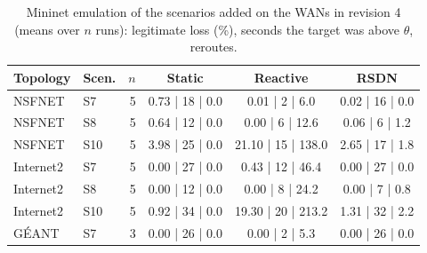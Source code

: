 \begin{table}[t]\centering\scriptsize
\caption{Mininet emulation of the scenarios added on the WANs in revision 4 (means over $n$ runs): legitimate loss (\%), seconds the target was above $\theta$, reroutes.}
\label{tab:wan_ext}
\setlength{\tabcolsep}{2.5pt}
\begin{tabular}{llrccc}
\toprule
Topology & Scen. & $n$ & Static & Reactive & RSDN\\
\midrule
NSFNET & S7 & 5 & 0.73 | 18 | 0.0 & 0.01 | 2 | 6.0 & 0.02 | 16 | 0.0\\
NSFNET & S8 & 5 & 0.64 | 12 | 0.0 & 0.00 | 6 | 12.6 & 0.06 | 6 | 1.2\\
NSFNET & S10 & 5 & 3.98 | 25 | 0.0 & 21.10 | 15 | 138.0 & 2.65 | 17 | 1.8\\
Internet2 & S7 & 5 & 0.00 | 27 | 0.0 & 0.43 | 12 | 46.4 & 0.00 | 27 | 0.0\\
Internet2 & S8 & 5 & 0.00 | 12 | 0.0 & 0.00 | 8 | 24.2 & 0.00 | 7 | 0.8\\
Internet2 & S10 & 5 & 0.92 | 34 | 0.0 & 19.30 | 20 | 213.2 & 1.31 | 32 | 2.2\\
G\'EANT & S7 & 3 & 0.00 | 26 | 0.0 & 0.00 | 2 | 5.3 & 0.00 | 26 | 0.0\\
\bottomrule
\end{tabular}
\end{table}